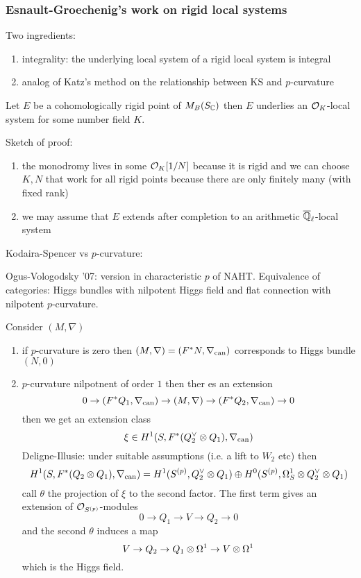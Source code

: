 \documentclass[12pt]{article}
\begin{document}
\subsubsection{Esnault-Groechenig's work on rigid local systems}

Two ingredients:
\begin{enumerate}
\item integrality: the underlying local system of a rigid local system is integral
\item analog of Katz's method on the relationship between KS and $p$-curvature
\end{enumerate}

\begin{theorem}[EG, 2017]
Let $E$ be a cohomologically rigid point of $M_B(S_{\mathbb{C}})$ then $E$ underlies an $\mathcal{O}_{K}$-local system for some number field $K$.  
\end{theorem}

Sketch of proof: 
\begin{enumerate}
\item the monodromy lives in some $\mathcal{O}_{K}[1/N]$ because it is rigid and we can choose $K,N$ that work for all rigid points because there are only finitely many (with fixed rank)
\item we may assume that $E$ extends after completion to an arithmetic $\overline{\mathbb{Q}}_{\ell}$-local system 
\end{enumerate}

Kodaira-Spencer vs $p$-curvature:

Ogus-Vologodsky '07: version in characteristic $p$ of NAHT. Equivalence of categories: Higgs bundles with nilpotent Higgs field and flat connection with nilpotent $p$-curvature. 

\begin{example}
Consider $(M, \nabla)$
\begin{enumerate}
\item if $p$-curvature is zero then $(M, \nabla) = (F^* N, \nabla_{\mathrm{can}})$ corresponds to Higgs bundle $(N, 0)$ 
\item $p$-curvature nilpotnent of order $1$ then ther es an extension
\[ 0 \to (F^* Q_1, \nabla_{\mathrm{can}}) \to (M, \nabla) \to (F^* Q_2,\nabla_{\mathrm{can}}) \to 0 \]
then we get an extension class
\[ \xi \in H^1(S, F^* (Q_2^\vee \otimes Q_1), \nabla_{\mathrm{can}}) \]
Deligne-Illusie: under suitable assumptions (i.e. a lift to $W_2$ etc) then 
\[ H^1(S, F^* (Q_2 \otimes Q_1), \nabla_{\mathrm{can}}) = H^1(S^{(p)}, Q_2^\vee \otimes Q_1) \oplus H^0(S^{(p)}, \Omega^1_S \otimes Q_2^{\vee} \otimes Q_1) \]
call $\theta$ the projection of $\xi$ to the second factor. The first term gives an extension of $\mathcal{O}_{S^{(p)}}$-modules
\[ 0 \to Q_1 \to V \to Q_2 \to 0 \]
and the second $\theta$ induces a map
\[ V \to Q_2 \to Q_1 \otimes \Omega^1 \to V \otimes \Omega^1 \]
which is the Higgs field.
\end{enumerate}
\end{example}
\end{document}
